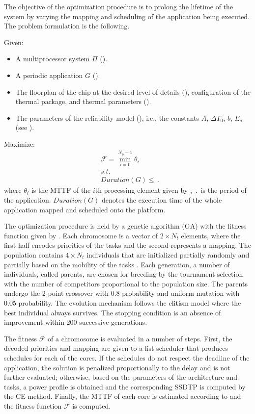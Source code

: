 The objective of the optimization procedure is to prolong the lifetime of the system by varying the mapping and scheduling of the application being executed. The problem formulation is the following.

Given:

\begin{itemize}
  \item A multiprocessor system $\Pi$ ().
  \item A periodic application $G$ ().
  \item The floorplan of the chip at the desired level of details (), configuration of the thermal package, and thermal parameters ().
  \item The parameters of the reliability model (), i.e., the constants $A$, $\Delta T_0$, $b$, $E_a$ (see ).
\end{itemize}

Maximize:
\begin{align}
  & \mathcal{F} = \min_{i = 0}^{N_p - 1} \theta_i \label{eq:fitness-function} \\
  & s.t. \nonumber \\
  & Duration(G) \leq \period \nonumber
\end{align}
where $\theta_i$ is the MTTF of the $i$th processing element given by , $\period$ is the period of the application. $Duration(G)$ denotes the execution time of the whole application mapped and scheduled onto the platform.

The optimization procedure is held by a genetic algorithm (GA) \cite{schmitz2004} with the fitness function given by . Each chromosome is a vector of $2 \times N_t$ elements, where the first half encodes priorities of the tasks and the second represents a mapping. The population contains $4 \times N_t$ individuals that are initialized partially randomly and partially based on the mobility of the tasks \cite{schmitz2004}. Each generation, a number of individuals, called parents, are chosen for breeding by the tournament selection with the number of competitors proportional to the population size. The parents undergo the 2-point crossover with $0.8$ probability and uniform mutation with $0.05$ probability. The evolution mechanism follows the elitism model where the best individual always survives. The stopping condition is an absence of improvement within $200$ successive generations.

The fitness $\mathcal{F}$ of a chromosome is evaluated in a number of steps. First, the decoded priorities and mapping are given to a list scheduler that produces schedules for each of the cores. If the schedules do not respect the deadline of the application, the solution is penalized proportionally to the delay and is not further evaluated; otherwise, based on the parameters of the architecture and tasks, a power profile is obtained and the corresponding SSDTP is computed by the CE method. Finally, the MTTF of each core is estimated according to  and the fitness function $\mathcal{F}$ is computed.
